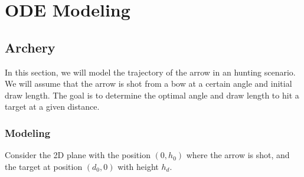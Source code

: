 \chapter{ODE Modeling}

\section{Archery}
In this section, we will model the trajectory of the arrow in an hunting scenario. We will assume that the arrow is shot from a bow at a certain angle and initial draw length. The goal is to determine the optimal angle and draw length to hit a target at a given distance.
\subsection{Modeling}
Consider the 2D plane with the position $(0,h_0)$ where the arrow is shot, and the target at position $(d_0,0)$ with height $h_d$.
